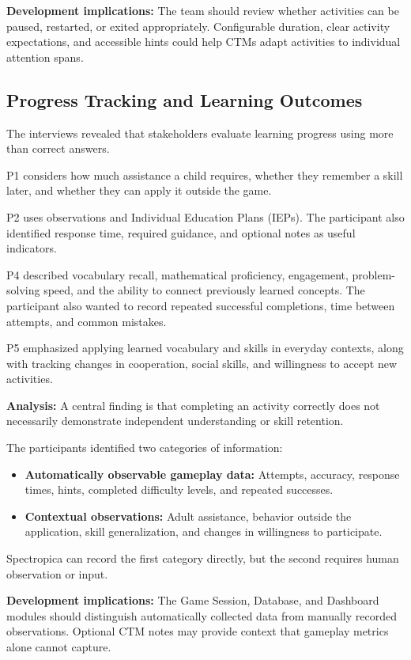 \documentclass[12pt, titlepage]{article}
\begin{document}
\noindent\textbf{Development implications:} The team should review whether activities can be paused, restarted, or exited appropriately. Configurable duration, clear activity expectations, and accessible hints could help CTMs adapt activities to individual attention spans.

\subsection{Progress Tracking and Learning Outcomes}

The interviews revealed that stakeholders evaluate learning progress using more than correct answers.

P1 considers how much assistance a child requires, whether they remember a skill later, and whether they can apply it outside the game.

P2 uses observations and Individual Education Plans (IEPs). The participant also identified response time, required guidance, and optional notes as useful indicators.

P4 described vocabulary recall, mathematical proficiency, engagement, problem-solving speed, and the ability to connect previously learned concepts. The participant also wanted to record repeated successful completions, time between attempts, and common mistakes.

P5 emphasized applying learned vocabulary and skills in everyday contexts, along with tracking changes in cooperation, social skills, and willingness to accept new activities.

\noindent\textbf{Analysis:} A central finding is that completing an activity correctly does not necessarily demonstrate independent understanding or skill retention.

The participants identified two categories of information:
\begin{itemize}
\item \textbf{Automatically observable gameplay data:} Attempts, accuracy, response times, hints, completed difficulty levels, and repeated successes.
\item \textbf{Contextual observations:} Adult assistance, behavior outside the application, skill generalization, and changes in willingness to participate.
\end{itemize}

Spectropica can record the first category directly, but the second requires human observation or input.

\noindent\textbf{Development implications:} The Game Session, Database, and Dashboard modules should distinguish automatically collected data from manually recorded observations. Optional CTM notes may provide context that gameplay metrics alone cannot capture.
\end{document}

